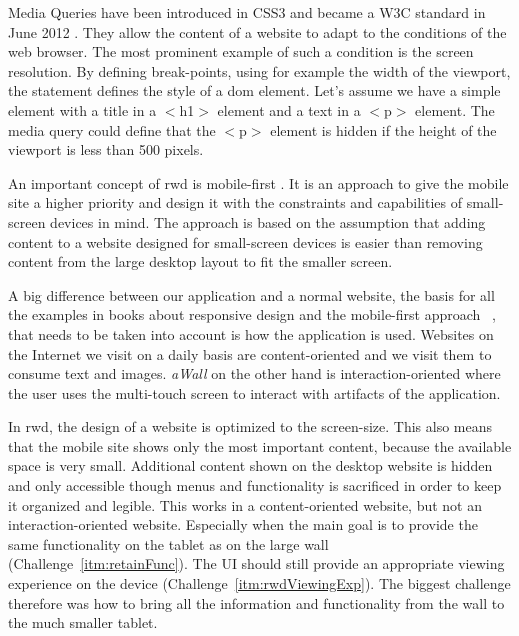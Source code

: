 \documentclass{sigchi}
\begin{document}
Media Queries have been introduced in CSS3 and became a W3C standard in June 2012 \cite{mediaqueriesW3C}.
They allow the content of a website to adapt to the conditions of the web browser.
The most prominent example of such a condition is the screen resolution.
By defining break-points, using for example the width of the viewport, the statement defines the style of a \gls{dom} element.
Let's assume we have a simple element with a title in a $<$h1$>$ element and a text in a $<$p$>$ element.
The media query could define that the $<$p$>$ element is hidden if the height of the viewport is less than 500 pixels.

An important concept of \gls{rwd} is mobile-first \cite{Wroblewski:2011}. 
It is an approach to give the mobile site a higher priority and design it with the constraints and capabilities of small-screen devices in mind. 
The approach is based on the assumption that adding content to a website designed for small-screen devices is easier than removing content from the large desktop layout to fit the smaller screen.

A big difference between our application and a normal website, the basis for all the examples in books about responsive design and the mobile-first approach ~\cite{Marcotte:2011,Wroblewski:2011}, that needs to be taken into account is how the application is used.
Websites on the Internet we visit on a daily basis are content-oriented and we visit them to consume text and images.
\textit{aWall} on the other hand is interaction-oriented where the user uses the multi-touch screen to interact with artifacts of the application.

In \gls{rwd}, the design of a website is optimized to the screen-size.
This also means that the mobile site shows only the most important content, because the available space is very small.
Additional content shown on the desktop website is hidden and only accessible though menus and functionality is sacrificed in order to  keep it organized and legible. 
This works in a content-oriented website, but not an interaction-oriented website.
Especially when the main goal is to provide the same functionality on the tablet as on the large wall (Challenge~\ref{itm:retainFunc}).
The UI should still provide an appropriate viewing experience on the device (Challenge~\ref{itm:rwdViewingExp}).
The biggest challenge therefore was how to bring all the information and functionality from the wall to the much smaller tablet.
\end{document}

